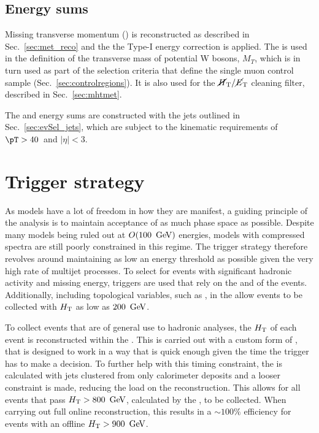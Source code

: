 \subsection{Energy sums}

Missing transverse momentum (\MET) is reconstructed as described in
Sec.~\ref{sec:met_reco} and the the Type-I \MET energy correction is applied.
The \met is used in the definition of 
the transverse mass of potential W bosons, $M_{T}$, which is in turn used as part of
the selection criteria that define the single muon control sample 
(Sec.~\ref{sec:controlregions}). It is also used for the $\mbox{$\mbox{$\cancel{H}_\text{T}$} / \mbox{$\cancel{E}_\text{T}$}$}$ cleaning
filter, described in Sec.~\ref{sec:mhtmet}.

The \HT and \MHT energy sums are constructed with the jets outlined in
Sec.~\ref{sec:evSel_jets}, which are subject to the kinematic requirements of
$\pT>40$~\gev and $|\eta|<3$.

\section{Trigger strategy}
\label{sec:trigStrat}

As \SUSY models have a lot of freedom in how they are manifest, a
guiding principle of the analysis is to maintain acceptance of as much
phase space as possible. Despite many \SUSY models being ruled out at
$O(100~\mathrm{\,Ge\kern -0.1em V})$ energies, models with compressed spectra are still poorly
constrained in this regime. The trigger strategy therefore revolves
around maintaining as low an energy threshold as possible given the
very high rate of \QCD multijet processes. To select for events with
significant hadronic activity and missing energy, triggers are used
that rely on the \HT and \MHT of the events. Additionally, including
topological variables, such as \alphat, in the \HLT allow events to be
collected with $\mbox{$H_\text{T}$}$ as low as $200~\mathrm{\,Ge\kern -0.1em V}$.

To collect events that are of general use to hadronic analyses, the
$\mbox{$H_\text{T}$}$ of each event is reconstructed within the \HLT. This is carried
out with a custom form of \PF, that is designed to work in a way that
is quick enough given the time the trigger has to make a decision. To
further help with this timing constraint, the \HT is calculated with
jets clustered from only calorimeter deposits and a looser constraint
is made, reducing the load on the \PF reconstruction. This allows for
all events that pass $\mbox{$H_\text{T}$}>800~\mathrm{\,Ge\kern -0.1em V}$, calculated by the \HLT,
to be collected. When carrying out full online reconstruction, this
results in a $\sim 100\%$ efficiency for events with an offline
$\mbox{$H_\text{T}$}>900~\mathrm{\,Ge\kern -0.1em V}$. 

